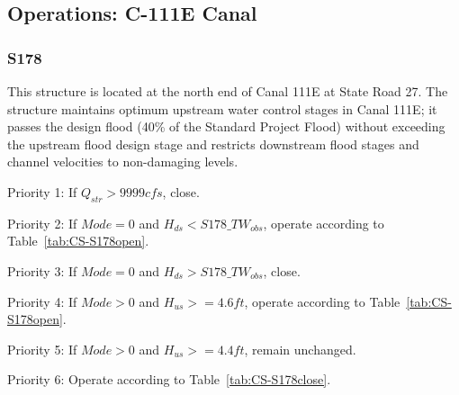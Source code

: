 \clearpage
\subsection{Operations: C-111E Canal}

\subsubsection{S178}
This structure is located at the north end of Canal 111E at State Road 27. The structure maintains optimum upstream water control stages in Canal 111E; it passes the design flood (40\% of the Standard Project Flood) without exceeding the upstream flood design stage and restricts downstream flood stages and channel velocities to non-damaging levels.




\begin{packed_items}
\item Priority 1: If $Q_{str}>9999 cfs$, close.
\item[]
\item Priority 2: If $Mode=0$ and $H_{ds}<S178\_TW_{obs}$, operate according to Table~\ref{tab:CS-S178open}.
\item Priority 3: If $Mode=0$ and $H_{ds}>S178\_TW_{obs}$, close.
\item[]
\item Priority 4: If $Mode>0$ and $H_{us}>=4.6 ft$, operate according to Table~\ref{tab:CS-S178open}.
\item Priority 5: If $Mode>0$ and $H_{us}>=4.4 ft$, remain unchanged.
\item[]
\item Priority 6: Operate according to Table~\ref{tab:CS-S178close}.
\end{packed_items}

